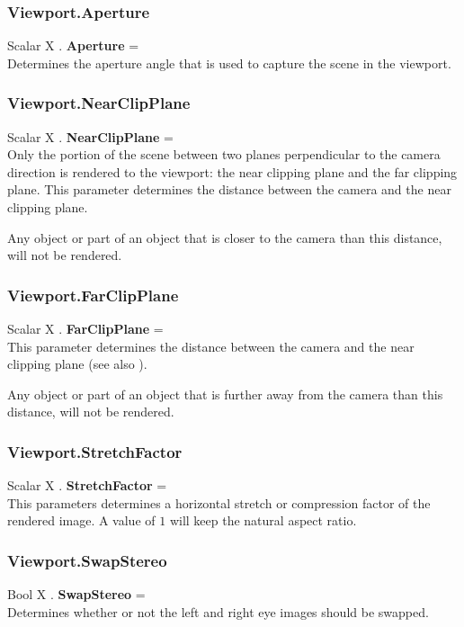 \subsubsection{Viewport.Aperture \label{F:Viewport:Aperture}}
Scalar X . \textbf{Aperture} = \\
Determines the aperture angle that is used to capture the scene in the viewport.

\subsubsection{Viewport.NearClipPlane \label{F:Viewport:NearClipPlane}}
Scalar X . \textbf{NearClipPlane} = \\
Only the portion of the scene between two planes perpendicular to the camera direction is rendered to the viewport: the near clipping plane and the far clipping plane. This parameter determines the distance between the camera and the near clipping plane.

Any object or part of an object that is closer to the camera than this distance, will not be rendered.

\subsubsection{Viewport.FarClipPlane \label{F:Viewport:FarClipPlane}}
Scalar X . \textbf{FarClipPlane} = \\
This parameter determines the distance between the camera and the near clipping plane (see also ).

Any object or part of an object that is further away from the camera than this distance, will not be rendered.

\subsubsection{Viewport.StretchFactor \label{F:Viewport:StretchFactor}}
Scalar X . \textbf{StretchFactor} = \\
This parameters determines a horizontal stretch or compression factor of the rendered image. A value of $1$ will keep the natural aspect ratio.

\subsubsection{Viewport.SwapStereo \label{F:Viewport:SwapStereo}}
Bool X . \textbf{SwapStereo} = \\
Determines whether or not the left and right eye images should be swapped.

